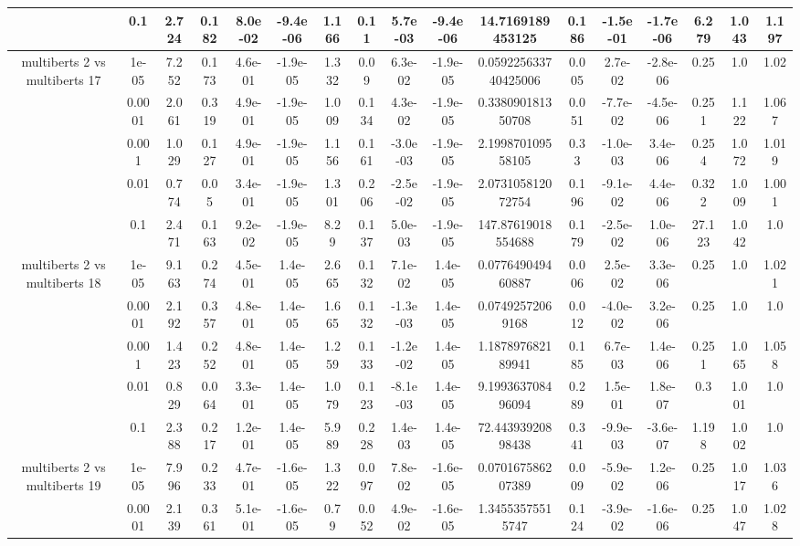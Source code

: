 \begin{tabular}{|c|c|c|c|c|c|c|c|c|c|c|c|c|c|c|c|c|}
 & 0.1 & 2.724 & 0.182 & 8.0e-02 & -9.4e-06 & 1.166 & 0.11 & 5.7e-03 & -9.4e-06 & 14.7169189453125 & 0.186 & -1.5e-01 & -1.7e-06 & 6.279 & 1.043 & 1.197 \\
\hline
\multirow{5}{*}{multiberts 2 vs multiberts 17} & 1e-05 & 7.252 & 0.173 & 4.6e-01 & -1.9e-05 & 1.332 & 0.09 & 6.3e-02 & -1.9e-05 & 0.059225633740425006 & 0.005 & 2.7e-02 & -2.8e-06 & 0.25 & 1.0 & 1.02 \\
 & 0.0001 & 2.061 & 0.319 & 4.9e-01 & -1.9e-05 & 1.009 & 0.134 & 4.3e-02 & -1.9e-05 & 0.338090181350708 & 0.051 & -7.7e-02 & -4.5e-06 & 0.251 & 1.122 & 1.067 \\
 & 0.001 & 1.029 & 0.127 & 4.9e-01 & -1.9e-05 & 1.156 & 0.161 & -3.0e-03 & -1.9e-05 & 2.199870109558105 & 0.33 & -1.0e-03 & 3.4e-06 & 0.254 & 1.072 & 1.019 \\
 & 0.01 & 0.774 & 0.05 & 3.4e-01 & -1.9e-05 & 1.301 & 0.206 & -2.5e-02 & -1.9e-05 & 2.073105812072754 & 0.196 & -9.1e-02 & 4.4e-06 & 0.322 & 1.009 & 1.001 \\
 & 0.1 & 2.471 & 0.163 & 9.2e-02 & -1.9e-05 & 8.29 & 0.137 & 5.0e-03 & -1.9e-05 & 147.87619018554688 & 0.179 & -2.5e-02 & 1.0e-06 & 27.123 & 1.042 & 1.0 \\
\hline
\multirow{5}{*}{multiberts 2 vs multiberts 18} & 1e-05 & 9.163 & 0.274 & 4.5e-01 & 1.4e-05 & 2.665 & 0.132 & 7.1e-02 & 1.4e-05 & 0.077649049460887 & 0.006 & 2.5e-02 & 3.3e-06 & 0.25 & 1.0 & 1.021 \\
 & 0.0001 & 2.192 & 0.357 & 4.8e-01 & 1.4e-05 & 1.665 & 0.132 & -1.3e-03 & 1.4e-05 & 0.07492572069168 & 0.012 & -4.0e-02 & 3.2e-06 & 0.25 & 1.0 & 1.0 \\
 & 0.001 & 1.423 & 0.252 & 4.8e-01 & 1.4e-05 & 1.259 & 0.133 & -1.2e-02 & 1.4e-05 & 1.187897682189941 & 0.185 & 6.7e-03 & 1.4e-06 & 0.251 & 1.065 & 1.058 \\
 & 0.01 & 0.829 & 0.064 & 3.3e-01 & 1.4e-05 & 1.079 & 0.123 & -8.1e-03 & 1.4e-05 & 9.199363708496094 & 0.289 & 1.5e-01 & 1.8e-07 & 0.3 & 1.001 & 1.0 \\
 & 0.1 & 2.388 & 0.217 & 1.2e-01 & 1.4e-05 & 5.989 & 0.228 & 1.4e-03 & 1.4e-05 & 72.44393920898438 & 0.341 & -9.9e-03 & -3.6e-07 & 1.198 & 1.002 & 1.0 \\
\hline
\multirow{5}{*}{multiberts 2 vs multiberts 19} & 1e-05 & 7.996 & 0.233 & 4.7e-01 & -1.6e-05 & 1.322 & 0.097 & 7.8e-02 & -1.6e-05 & 0.070167586207389 & 0.009 & -5.9e-02 & 1.2e-06 & 0.25 & 1.017 & 1.036 \\
 & 0.0001 & 2.139 & 0.361 & 5.1e-01 & -1.6e-05 & 0.79 & 0.052 & 4.9e-02 & -1.6e-05 & 1.34553575515747 & 0.124 & -3.9e-02 & -1.6e-06 & 0.25 & 1.047 & 1.028 \\

\end{tabular}
